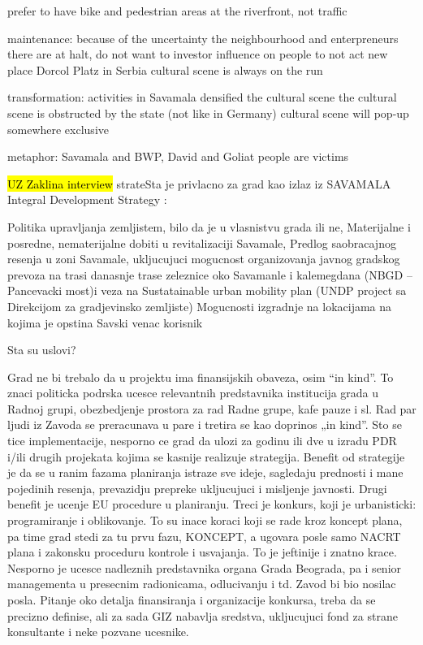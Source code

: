 \documentclass[11pt]{report}
\begin{document}
prefer to have bike and pedestrian areas at the riverfront, not traffic

maintenance:
because of the uncertainty the neighbourhood and enterpreneurs there are at halt, do not want to investor
influence on people to not act
new place Dorcol Platz
in Serbia cultural scene is always on the run

transformation:
activities in Savamala densified the cultural scene
the cultural scene is obstructed by the state (not like in Germany)
cultural scene will pop-up somewhere exclusive

metaphor: Savamala and BWP, David and Goliat
people are victims

\hl{UZ Zaklina interview}
strateSta je privlacno za grad kao izlaz iz SAVAMALA Integral Development Strategy :

    Politika upravljanja zemljistem, bilo da je u vlasnistvu grada ili ne,
    Materijalne i posredne, nematerijalne dobiti u revitalizaciji Savamale,
    Predlog saobracajnog resenja u zoni Savamale, ukljucujuci mogucnost organizovanja  javnog gradskog prevoza na trasi  danasnje trase zeleznice oko Savamanle i kalemegdana (NBGD –Pancevacki most)i veza na Sustatainable urban mobility plan (UNDP project sa Direkcijom za gradjevinsko zemljiste)
    Mogucnosti izgradnje na lokacijama na kojima je opstina Savski venac korisnik

Sta su uslovi?

    Grad ne bi trebalo da u projektu ima finansijskih obaveza, osim “in kind”. To znaci politicka podrska ucesce relevantnih predstavnika institucija grada u Radnoj grupi, obezbedjenje prostora za rad Radne grupe, kafe pauze i sl. Rad par ljudi iz Zavoda se preracunava u pare i tretira se kao doprinos „in kind”.
    Sto se tice implementacije, nesporno ce grad da ulozi za godinu ili dve u izradu PDR i/ili drugih projekata kojima se kasnije realizuje strategija.  Benefit od strategije je da se u ranim fazama planiranja istraze sve ideje, sagledaju prednosti i mane pojedinih resenja,  prevazidju prepreke ukljucujuci i misljenje javnosti. Drugi benefit je ucenje EU procedure u planiranju. Treci je  konkurs, koji je urbanisticki:  programiranje i oblikovanje. To su inace koraci koji se rade kroz koncept plana, pa time grad stedi za tu prvu fazu, KONCEPT, a ugovara posle samo NACRT plana i zakonsku proceduru kontrole i usvajanja. To je jeftinije i znatno krace.
    Nesporno je ucesce nadleznih predstavnika organa Grada Beograda, pa i senior managementa u presecnim radionicama, odlucivanju i td.
    Zavod bi bio nosilac posla.
    Pitanje oko detalja finansiranja i organizacije konkursa,  treba da se precizno definise, ali za sada GIZ nabavlja sredstva, ukljucujuci  fond za strane konsultante i neke pozvane ucesnike.
    
\end{document}
